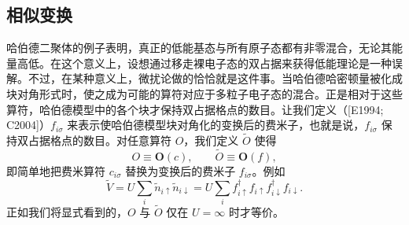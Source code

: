 \subsection*{相似变换}

哈伯德二聚体的例子表明，真正的低能基态与所有原子态都有非零混合，无论其能量高低。在这个意义上，设想通过移走裸电子态的双占据来获得低能理论是一种误解。不过，在某种意义上，微扰论做的恰恰就是这件事。当哈伯德哈密顿量被化成块对角形式时，使之成为可能的算符对应于多粒子电子态的混合。正是相对于这些算符，哈伯德模型中的各个块才保持双占据格点的数目。让我们定义（[E1994; C2004]）$f_{i\sigma}$ 来表示使哈伯德模型块对角化的变换后的费米子，也就是说，$f_{i\sigma}$ 保持双占据格点的数目。对任意算符 $O$，我们定义 $\tilde{O}$ 使得
\begin{equation*}
O\equiv\mathbf{O}(c),\qquad\tilde{O}\equiv\mathbf{O}(f),\tag{16.81}
\end{equation*}
即简单地把费米算符 $c_{i\sigma}$ 替换为变换后的费米子 $f_{i\sigma}$。例如
\begin{equation*}
\tilde{V}=U\sum_{i}\tilde{n}_{i\uparrow}\tilde{n}_{i\downarrow}=U\sum_{i}f^{\dagger}_{i\uparrow}f_{i\uparrow}f^{\dagger}_{i\downarrow}f_{i\downarrow}.\tag{16.82}
\end{equation*}
正如我们将显式看到的，$O$ 与 $\tilde{O}$ 仅在 $U=\infty$ 时才等价。

